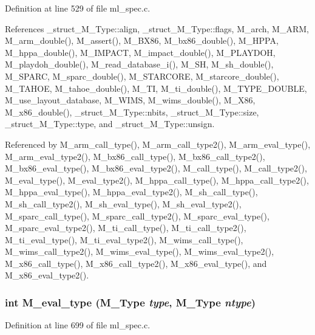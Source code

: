 Definition at line 529 of file ml\_\-spec.c.

References \_\-struct\_\-M\_\-Type::align, \_\-struct\_\-M\_\-Type::flags, M\_\-arch, M\_\-ARM, M\_\-arm\_\-double(), M\_\-assert(), M\_\-BX86, M\_\-bx86\_\-double(), M\_\-HPPA, M\_\-hppa\_\-double(), M\_\-IMPACT, M\_\-impact\_\-double(), M\_\-PLAYDOH, M\_\-playdoh\_\-double(), M\_\-read\_\-database\_\-i(), M\_\-SH, M\_\-sh\_\-double(), M\_\-SPARC, M\_\-sparc\_\-double(), M\_\-STARCORE, M\_\-starcore\_\-double(), M\_\-TAHOE, M\_\-tahoe\_\-double(), M\_\-TI, M\_\-ti\_\-double(), M\_\-TYPE\_\-DOUBLE, M\_\-use\_\-layout\_\-database, M\_\-WIMS, M\_\-wims\_\-double(), M\_\-X86, M\_\-x86\_\-double(), \_\-struct\_\-M\_\-Type::nbits, \_\-struct\_\-M\_\-Type::size, \_\-struct\_\-M\_\-Type::type, and \_\-struct\_\-M\_\-Type::unsign.

Referenced by M\_\-arm\_\-call\_\-type(), M\_\-arm\_\-call\_\-type2(), M\_\-arm\_\-eval\_\-type(), M\_\-arm\_\-eval\_\-type2(), M\_\-bx86\_\-call\_\-type(), M\_\-bx86\_\-call\_\-type2(), M\_\-bx86\_\-eval\_\-type(), M\_\-bx86\_\-eval\_\-type2(), M\_\-call\_\-type(), M\_\-call\_\-type2(), M\_\-eval\_\-type(), M\_\-eval\_\-type2(), M\_\-hppa\_\-call\_\-type(), M\_\-hppa\_\-call\_\-type2(), M\_\-hppa\_\-eval\_\-type(), M\_\-hppa\_\-eval\_\-type2(), M\_\-sh\_\-call\_\-type(), M\_\-sh\_\-call\_\-type2(), M\_\-sh\_\-eval\_\-type(), M\_\-sh\_\-eval\_\-type2(), M\_\-sparc\_\-call\_\-type(), M\_\-sparc\_\-call\_\-type2(), M\_\-sparc\_\-eval\_\-type(), M\_\-sparc\_\-eval\_\-type2(), M\_\-ti\_\-call\_\-type(), M\_\-ti\_\-call\_\-type2(), M\_\-ti\_\-eval\_\-type(), M\_\-ti\_\-eval\_\-type2(), M\_\-wims\_\-call\_\-type(), M\_\-wims\_\-call\_\-type2(), M\_\-wims\_\-eval\_\-type(), M\_\-wims\_\-eval\_\-type2(), M\_\-x86\_\-call\_\-type(), M\_\-x86\_\-call\_\-type2(), M\_\-x86\_\-eval\_\-type(), and M\_\-x86\_\-eval\_\-type2().
\subsubsection{\setlength{\rightskip}{0pt plus 5cm}int M\_\-eval\_\-type (\bf{M\_\-Type} {\em type}, \bf{M\_\-Type} {\em ntype})}\label{m__spec_8h_f7364cdf9256109f39c97b07c7c30d79}




Definition at line 699 of file ml\_\-spec.c.

